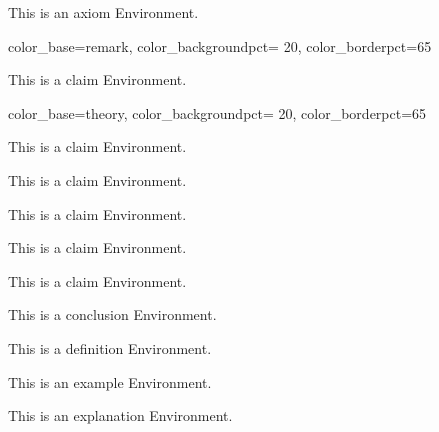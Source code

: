 \documentclass{ximera}
\begin{document}
\begin{axiom}
    This is an axiom Environment.
\end{axiom}%

     { color_base=remark,  color_backgroundpct= 20, color_borderpct=65 }

\begin{claim}
    This is a claim Environment.
\end{claim}%

     { color_base=theory,  color_backgroundpct= 20, color_borderpct=65 }

\begin{claim}
    This is a claim Environment.
\end{claim}%


\providecommand{\tcbset}[1]{}    %

  \tcbset{xmdefault/.style={
                  enhanced jigsaw,
                  before skip = 5pt,
                  after skip  = 20pt,
                  breakable,
  } }

  \begin{claim}
    This is a claim Environment.
\end{claim}%


\tcbset{claim-style/.style={colback=red} }
        \tcbset{
}

\begin{claim}
    This is a claim Environment.
\end{claim}%

\tcbset{claim-style/.style={colback=green} }

\begin{claim}
    This is a claim Environment.
\end{claim}%

\tcbset{claim-style/.style={blanker} }

\begin{claim}
    This is a claim Environment.
\end{claim}%

\begin{conclusion}
    This is a conclusion Environment.
\end{conclusion}%

\begin{definition}
    This is a definition Environment.
\end{definition}%

\begin{example}
    This is an example Environment.
\end{example}%

\begin{explanation}
    This is an explanation Environment.
\end{explanation}%
\end{document}
